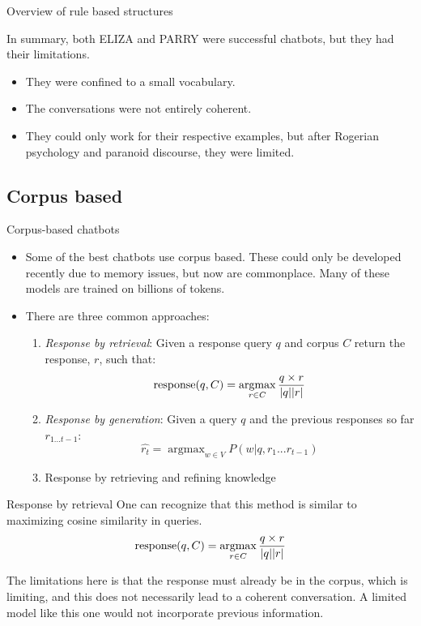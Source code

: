 \documentclass[10pt]{beamer}
\DeclareMathOperator*{\argmax}{argmax} %
\begin{document}
\begin{frame}{Overview of rule based structures}

In summary, both ELIZA and PARRY were successful chatbots, but they had their limitations.

\begin{itemize}
    \item They were confined to a small vocabulary.
    \item The conversations were not entirely coherent.
    \item They could only work for their respective examples, but after Rogerian psychology and paranoid discourse, they were limited.
\end{itemize}

\end{frame}

\subsection{Corpus based}

\begin{frame}{Corpus-based chatbots}
\begin{itemize}
    \item Some of the best chatbots use corpus based.  These could only be developed recently due to memory issues, but now are commonplace.  Many of these models are trained on billions of tokens.
    \item There are three common approaches:
    \begin{enumerate}
    \item \textit{Response by retrieval}: Given a response query $q$ and corpus $C$ return the response, $r$, such that:
    \[
    \textnormal{response}(q, C) = \argmax_{r \in C} \frac{q \times r}{|q||r|}
    \]
    \item \textit{Response by generation}: Given a query $q$ and the previous responses so far $r_{1 ... t-1}$:
    \[\hat{r_t} = \argmax_{w\in V} P(w|q, r_1...r_{t - 1})\]
    \item Response by retrieving and refining knowledge
    \end{enumerate}
\end{itemize}
\end{frame}

\begin{frame}{Response by retrieval}
One can recognize that this method is similar to maximizing cosine similarity in queries. \\

\[
\textnormal{response}(q, C) = \argmax_{r \in C} \frac{q \times r}{|q||r|}
\]

The limitations here is that the response must already be in the corpus, which is limiting, and this does not necessarily lead to a coherent conversation.  A limited model like this one would not incorporate previous information.



\end{frame}
\end{document}
